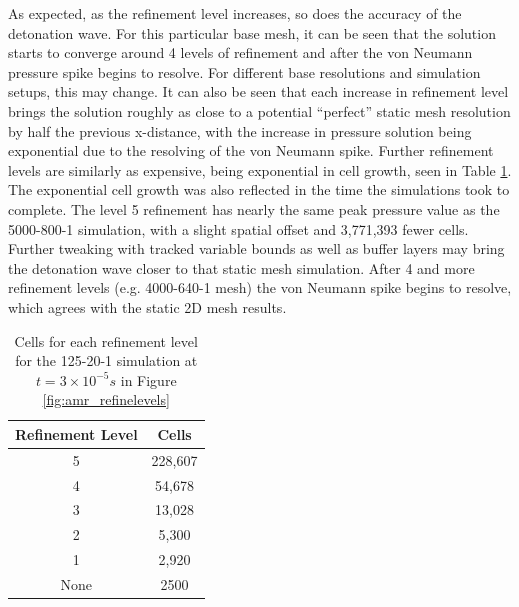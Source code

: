 \noindent As expected, as the refinement level increases, so does the accuracy of the detonation wave. For this particular base mesh, it can be seen that the solution starts to converge around 4 levels of refinement and after the von Neumann pressure spike begins to resolve. For different base resolutions and simulation setups, this may change. It can also be seen that each increase in refinement level brings the solution roughly as close to a potential ``perfect'' static mesh resolution by half the previous x-distance, with the increase in pressure solution being exponential due to the resolving of the von Neumann spike. Further refinement levels are similarly as expensive, being exponential in cell growth, seen in Table \ref{tab:amr_refinelevels}. The exponential cell growth was also reflected in the time the simulations took to complete. The level 5 refinement has nearly the same peak pressure value as the 5000-800-1 simulation, with a slight spatial offset and 3,771,393 fewer cells. Further tweaking with tracked variable bounds as well as buffer layers may bring the detonation wave closer to that static mesh simulation. After 4 and more refinement levels (e.g. 4000-640-1 mesh) the von Neumann spike begins to resolve, which agrees with the static 2D mesh results. 


\begin{table}[h]
\centering
\caption{Cells for each refinement level for the 125-20-1 simulation at \(t = 3\times 10^{ - 5} s\) in Figure \ref{fig:amr_refinelevels}}
\label{tab:amr_refinelevels}
\begin{tabular}{cc}
Refinement Level & Cells \\ \hline
5 & 228,607 \\ 
4 & 54,678 \\ 
3 & 13,028 \\ 
2 & 5,300 \\
1 & 2,920 \\
None & 2500 \\
\end{tabular}
\end{table}

